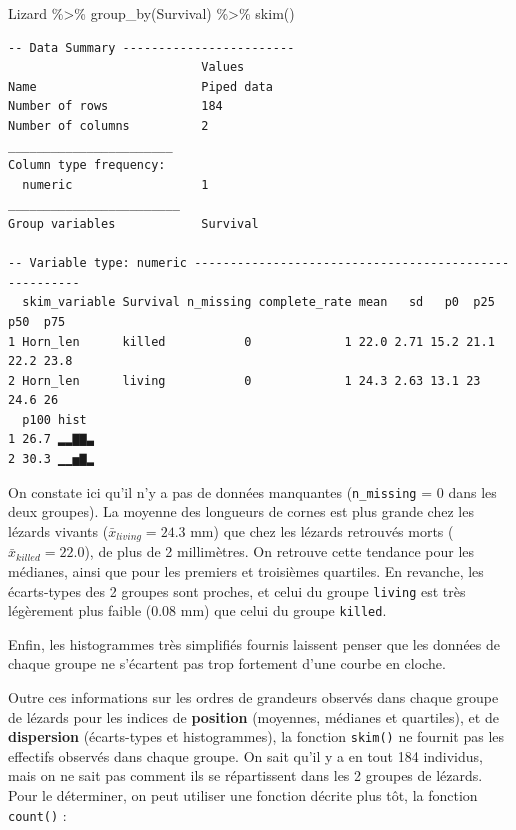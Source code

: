 \documentclass[
  a4paper,
  DIV=11,
  numbers=noendperiod,
  oneside]{scrreprt}
\newenvironment{Shaded}{}{}
\newcommand{\FunctionTok}[1]{\textcolor[rgb]{0.44,0.26,0.76}{#1}}
\newcommand{\NormalTok}[1]{\textcolor[rgb]{0.14,0.16,0.18}{#1}}
\newcommand{\SpecialCharTok}[1]{\textcolor[rgb]{0.00,0.36,0.77}{#1}}
\begin{document}
\begin{Shaded}
\begin{Highlighting}[]
\NormalTok{Lizard }\SpecialCharTok{\%\textgreater{}\%}
  \FunctionTok{group\_by}\NormalTok{(Survival) }\SpecialCharTok{\%\textgreater{}\%}
  \FunctionTok{skim}\NormalTok{()}
\end{Highlighting}
\end{Shaded}

\begin{verbatim}
-- Data Summary ------------------------
                           Values    
Name                       Piped data
Number of rows             184       
Number of columns          2         
_______________________              
Column type frequency:               
  numeric                  1         
________________________             
Group variables            Survival  

-- Variable type: numeric ------------------------------------------------------
  skim_variable Survival n_missing complete_rate mean   sd   p0  p25  p50  p75
1 Horn_len      killed           0             1 22.0 2.71 15.2 21.1 22.2 23.8
2 Horn_len      living           0             1 24.3 2.63 13.1 23   24.6 26  
  p100 hist 
1 26.7 ▂▂▇▇▃
2 30.3 ▁▁▅▇▂
\end{verbatim}

On constate ici qu'il n'y a pas de données manquantes
(\texttt{n\_missing} = 0 dans les deux groupes). La moyenne des
longueurs de cornes est plus grande chez les lézards vivants
(\(\bar{x}_{living} = 24.3\) mm) que chez les lézards retrouvés morts
(\(\bar{x}_{killed} = 22.0\)), de plus de 2 millimètres. On retrouve
cette tendance pour les médianes, ainsi que pour les premiers et
troisièmes quartiles. En revanche, les écarts-types des 2 groupes sont
proches, et celui du groupe \texttt{living} est très légèrement plus
faible (0.08 mm) que celui du groupe \texttt{killed}.

Enfin, les histogrammes très simplifiés fournis laissent penser que les
données de chaque groupe ne s'écartent pas trop fortement d'une courbe
en cloche.

Outre ces informations sur les ordres de grandeurs observés dans chaque
groupe de lézards pour les indices de \textbf{position} (moyennes,
médianes et quartiles), et de \textbf{dispersion} (écarts-types et
histogrammes), la fonction \texttt{skim()} ne fournit pas les effectifs
observés dans chaque groupe. On sait qu'il y a en tout 184 individus,
mais on ne sait pas comment ils se répartissent dans les 2 groupes de
lézards. Pour le déterminer, on peut utiliser une fonction décrite plus
tôt, la fonction \texttt{count()} :
\end{document}
